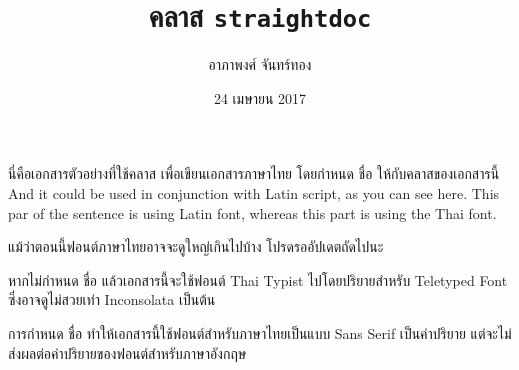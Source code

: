 \documentclass[10pt,twoside,thai,sansthai,notypist]{straightdoc}
\title{คลาส \texttt{straightdoc}}
\author{อาภาพงศ์ จันทร์ทอง}
\date{24 เมษายน 2017}
\begin{document}
    \maketitle

    นี่คือเอกสารตัวอย่างที่ใช้คลาส  เพื่อเขียนเอกสารภาษาไทย โดยกำหนด  ชื่อ  ให้กับคลาสของเอกสารนี้ \textlatin{And it could be used in conjunction with Latin script, as you can see here. This par of the sentence is using Latin font,} whereas this part is using the Thai font.

    แม้ว่าตอนนี้ฟอนต์ภาษาไทยอาจจะดูใหญ่เกินไปบ้าง โปรดรออัปเดตถัดไปนะ

    หากไม่กำหนด  ชื่อ  แล้วเอกสารนี้จะใช้ฟอนต์ Thai Typist ไปโดยปริยายสำหรับ Teletyped Font ซึ่งอาจดูไม่สวยเท่า Inconsolata เป็นต้น

    การกำหนด  ชื่อ  ทำให้เอกสารนี้ใช้ฟอนต์สำหรับภาษาไทยเป็นแบบ Sans Serif เป็นค่าปริยาย แต่จะไม่ส่งผลต่อค่าปริยายของฟอนต์สำหรับภาษาอังกฤษ
\end{document}
